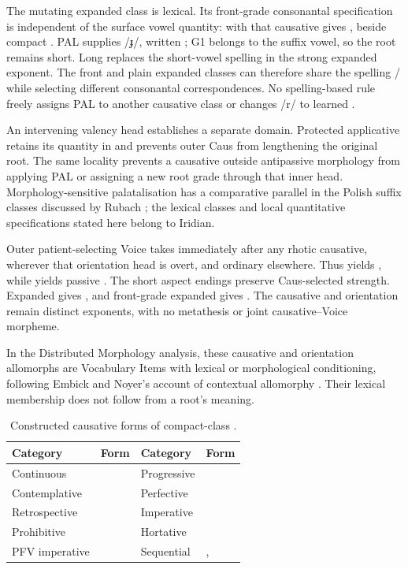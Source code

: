 The mutating expanded class is lexical. Its front-grade consonantal
specification is independent of the surface vowel quantity:
 with that causative gives , beside compact
. PAL supplies /ɟ/, written ; G1 belongs to
the suffix vowel, so the root remains short. Long  replaces
the short-vowel spelling  in the strong expanded exponent.
The front and plain expanded classes can therefore share the spelling
/ while selecting different consonantal
correspondences. No spelling-based rule freely assigns PAL to another
causative class or changes /r/ to learned .

An intervening valency head establishes a separate domain. Protected
applicative  retains its quantity in 
and prevents outer Caus from lengthening the original root. The same
locality prevents a causative outside antipassive morphology from applying
PAL or assigning a new root grade through that inner head.
Morphology-sensitive palatalisation has a comparative parallel in the Polish
suffix classes discussed by Rubach \cite[§§2--3]{rubach2019}; the lexical
classes and local quantitative specifications stated here belong to Iridian.

Outer patient-selecting Voice takes  immediately after any
rhotic causative, wherever that orientation head is overt, and ordinary
 elsewhere. Thus  yields
, while  yields passive
. The short aspect endings preserve Caus-selected
strength. Expanded  gives ,
and front-grade expanded  gives .
The causative and orientation remain distinct exponents, with no metathesis
or joint causative--Voice morpheme.

In the Distributed Morphology analysis, these causative and orientation
allomorphs are Vocabulary Items with lexical or morphological conditioning,
following Embick and Noyer's account of contextual allomorphy
\cite[§2.3]{embicknoyer2007}. Their lexical membership does not follow from
a root's meaning.

\begin{table}[htbp]
\footnotesize
\caption{Constructed causative forms of compact-class .}
\label{tab:rhotic-causative-paradigm}
\begin{tabularx}{\textwidth}{L L L L}
\toprule
Category & Form & Category & Form \\
\midrule
Continuous &  & Progressive &  \\
Contemplative &  & Perfective &  \\
Retrospective &  & Imperative &  \\
Prohibitive &  & Hortative &  \\
PFV imperative &  & Sequential & ,  \\
\bottomrule
\end{tabularx}
\end{table}

